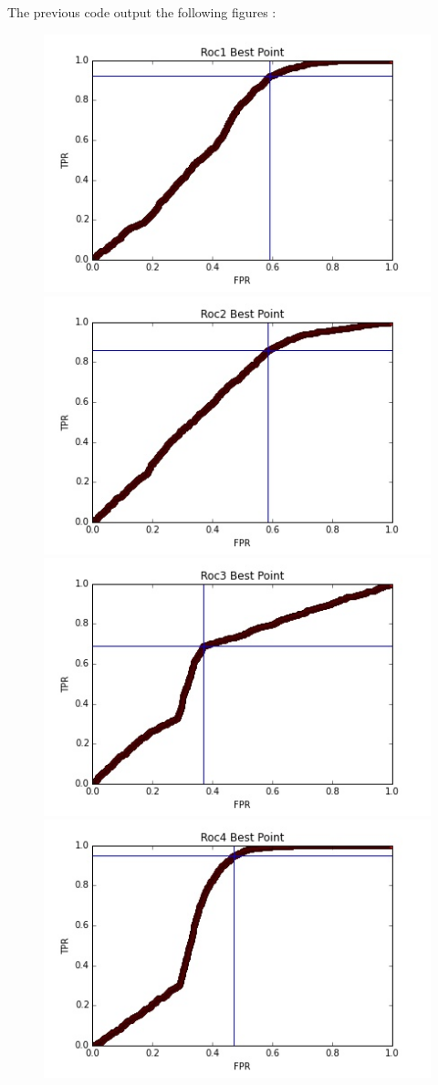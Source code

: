 \documentclass{article}
\begin{document}
The previous code output the following figures : 
\begin{figure}[H]
	\includegraphics[scale=0.58]{roc1_best.jpg}
	\includegraphics[scale=0.58]{roc2_best.jpg}\\
	\includegraphics[scale=0.58]{roc3_best.jpg}		\includegraphics[scale=0.58]{roc4_best.jpg}

\end{figure}
\end{document}
